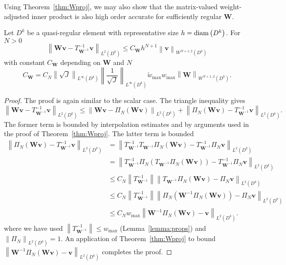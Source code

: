 \documentclass{siamart0216}
\newcommand{\nor}[1]{\left\| #1 \right\|}
\newcommand{\LRp}[1]{\left( #1 \right)}
\newcommand{\cond}[2]{\nor{#1}_{#2}\nor{{#1}^{-1}}_{#2}}
\newcommand{\LinfDk}{L^{\infty}\LRp{D^k}}
\begin{document}
Using Theorem~\ref{thm:Wproj}, we may also show that the matrix-valued weight-adjusted inner product is also high order accurate for sufficiently regular $\bm{W}$.
\begin{theorem}
Let $D^k$ be a quasi-regular element with representative size $h = {\rm diam}\LRp{D^k}$. For $N > 0$
\[
\nor{ \bm{W}\bm{v} - {T}^{-1}_{\bm{W}^{-1}}\bm{v} }_{L^2\LRp{D^k} } \leq C_{\bm{W}} h^{N+1} \nor{\bm{v}}_{W^{N+1,2}\LRp{D^k}}
\]
with constant $C_{\bm{W}}$ depending on $\bm{W}$ and $N$
\[
C_{\bm{W}} = C_N \nor{\sqrt{J}}_{\LinfDk}\nor{\frac{1}{\sqrt{J}}}_{\LinfDk} \tilde{w}_{\max}{w}_{\max} \nor{\bm{W}}_{W^{N+1,2}\LRp{D^k}}.  
\]
\end{theorem}
\begin{proof}
The proof is again similar to the scalar case.  The triangle inequality gives
\[
\nor{ \bm{W}\bm{v} - {T}^{-1}_{\bm{W}^{-1}}\bm{v} }_{L^2\LRp{D^k} } \leq \nor{ \bm{W}\bm{v} - \Pi_N(\bm{W}\bm{v})}_{L^2\LRp{D^k}} + \nor{\Pi_N(\bm{W}\bm{v}) - T^{-1}_{\bm{W}^{-1}}\bm{v} }_{L^2\LRp{D^k} }.  
\]
The former term is bounded by interpolation estimates and by arguments used in the proof of Theorem~\ref{thm:Wproj}.  The latter term is bounded 
\begin{align*}
\nor{\Pi_N(\bm{W}\bm{v})- T^{-1}_{\bm{W}^{-1}}\bm{v} }_{L^2\LRp{D^k}} &= \nor{T^{-1}_{\bm{W}^{-1}} T_{\bm{W}^{-1}}\Pi_N(\bm{W}\bm{v})- T^{-1}_{\bm{W}^{-1}}\Pi_N\bm{v} }_{L^2\LRp{D^k} } \\
&= \nor{T^{-1}_{\bm{W}^{-1}} \Pi_N \LRp{T_{\bm{W}^{-1}}\Pi_N(\bm{W}\bm{v})}- T^{-1}_{\bm{W}^{-1}}\Pi_N\bm{v} }_{L^2\LRp{D^k} } \\
&\leq C_N \nor{T^{-1}_{\bm{W}^{-1}}} \nor{ T_{\bm{W}^{-1}}\Pi_N(\bm{W}\bm{v})-\Pi_N\bm{v} }_{L^2\LRp{D^k} }\\
&\leq C_N \nor{T^{-1}_{\bm{W}^{-1}}} \nor{ \Pi_N\LRp{\bm{W}^{-1}\Pi_N(\bm{W}\bm{v})} - \Pi_N\bm{v} }_{L^2\LRp{D^k} }\\
&\leq C_N {w}_{\max} \nor{ \bm{W}^{-1}\Pi_N(\bm{W}\bm{v}) - \bm{v} }_{L^2\LRp{D^k} }.
\end{align*}
where we have used $\nor{T_{\bm{W}^{-1}}^{-1}} \leq {w}_{\max}$ (Lemma~\ref{lemma:props}) and $\nor{\Pi_N}_{L^2\LRp{D^k}} = 1$.  
An application of Theorem~\ref{thm:Wproj} to bound $\nor{ \bm{W}^{-1}\Pi_N(\bm{W}\bm{v}) - \bm{v} }_{L^2\LRp{D^k} }$ completes the proof.
\end{proof}

\end{document}
